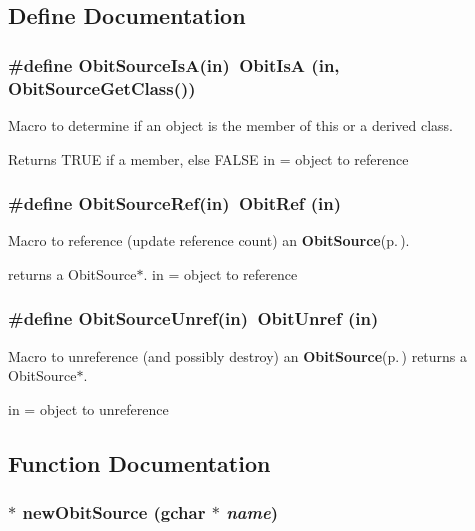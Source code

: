 \subsection{Define Documentation}
\subsubsection{\setlength{\rightskip}{0pt plus 5cm}\#define Obit\-Source\-Is\-A(in)\ Obit\-Is\-A (in, Obit\-Source\-Get\-Class())}\label{ObitSource_8h_a2}


Macro to determine if an object is the member of this or a derived class. 

Returns TRUE if a member, else FALSE in = object to reference 
\subsubsection{\setlength{\rightskip}{0pt plus 5cm}\#define Obit\-Source\-Ref(in)\ Obit\-Ref (in)}\label{ObitSource_8h_a1}


Macro to reference (update reference count) an {\bf Obit\-Source}{\rm (p.\,\pageref{structObitSource})}. 

returns a Obit\-Source$\ast$. in = object to reference 
\subsubsection{\setlength{\rightskip}{0pt plus 5cm}\#define Obit\-Source\-Unref(in)\ Obit\-Unref (in)}\label{ObitSource_8h_a0}


Macro to unreference (and possibly destroy) an {\bf Obit\-Source}{\rm (p.\,\pageref{structObitSource})} returns a Obit\-Source$\ast$. 

in = object to unreference 

\subsection{Function Documentation}
\subsubsection{$\ast$ new\-Obit\-Source (gchar $\ast$ {\em name})}\label{ObitSource_8h_a4}


